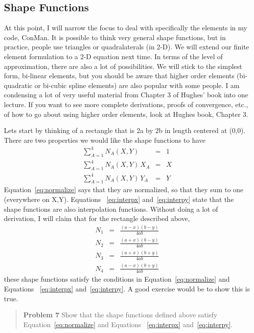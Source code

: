 \documentclass{article}
\begin{document}
\subsection{Shape Functions}

At this point, I will narrow the focus to deal with specifically the elements
in my code, ConMan.   It is possible to think very general shape functions,
but in practice, people use triangles or quadralaterals (in 2-D).   We will
extend our finite element formulation to a 2-D equation next time. 
In terms of the level of approximation, there are also a lot of possibilities. 
We will stick to the simplest form, bi-linear elements, but you should be aware
that higher order elements (bi-quadratic or bi-cubic spline elements) are also
popular with some people.   I am condensing a lot of very useful material from
Chapter 3 of Hughes' book into one lecture.   If you want to see more complete
derivations, proofs of convergence, etc., of how to go about using higher order
elements, look at Hughes book, Chapter 3.

Lets start by thinking of a rectangle that is 2a by 2b in length centered at
(0,0).  There are two properties we would like the shape functions to have
\begin{eqnarray}
\sum_{A=1} ^4 N_A(X,Y) & = & 1 \label{eq:normalize} \\
\sum_{A=1} ^4 N_A(X,Y) \, X_A & = & X \label{eq:interpx} \\
\sum_{A=1} ^4 N_A(X,Y) \, Y_A & = & Y \label{eq:interpy}
\end{eqnarray}
Equation~\ref{eq:normalize} says that they are normalized, so that they sum to
one (everywhere on X,Y).  Equations ~\ref{eq:interpx} and~\ref{eq:interpy}
state that the shape functions are also interpolation functions.   Without
doing a lot of derivation, I will claim that for the rectangle described
above,
\begin{eqnarray}
N_1 & = & \frac{(a-x)(b-y)}{4ab}  \\
N_2 & = & \frac{(a+x)(b-y)}{4ab}  \\
N_3 & = & \frac{(a+x)(b+y)}{4ab}  \\
N_4 & = & \frac{(a-x)(b+y)}{4ab}  
\end{eqnarray}
these shape functions satisfy the conditions in Equation~\ref{eq:normalize} and
Equations ~\ref{eq:interpx} and~\ref{eq:interpy}.  A good exercise would be to
show this is true.

\begin{quote} 
{\bf Problem 7} Show that the shape functions defined
above satisfy Equation~\ref{eq:normalize} and Equations
~\ref{eq:interpx} and~\ref{eq:interpy}.
\end{quote} 
\end{document}
